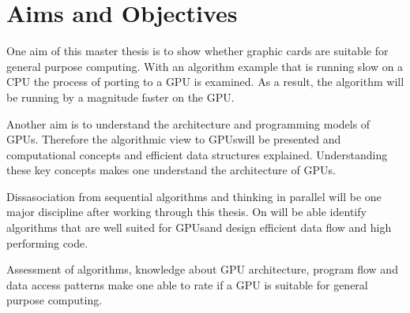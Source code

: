 \section*{Aims and Objectives} 
\label{sub:aims_and_objectives} 


One aim of this master thesis is to show whether graphic cards are suitable for 
general purpose computing. With an algorithm example that is running slow on a 
CPU the process of porting to a \gls{GPU} is examined. As a result, the algorithm
will be running by a magnitude faster on the GPU. 

Another aim is to understand the architecture and programming models of GPUs.
Therefore the algorithmic view to \glspl{GPU}will be presented and computational
concepts and efficient data structures explained. Understanding these key
concepts makes one understand the architecture of GPUs.


Dissasociation from sequential algorithms and thinking in parallel will be one
major discipline after working through this thesis. On will be able identify
algorithms that are well suited for \glspl{GPU}and design efficient data flow and high
performing code.

Assessment of algorithms, knowledge about \gls{GPU} architecture, program flow and
data access patterns make one able to rate if a \gls{GPU} is suitable for general
purpose computing.

